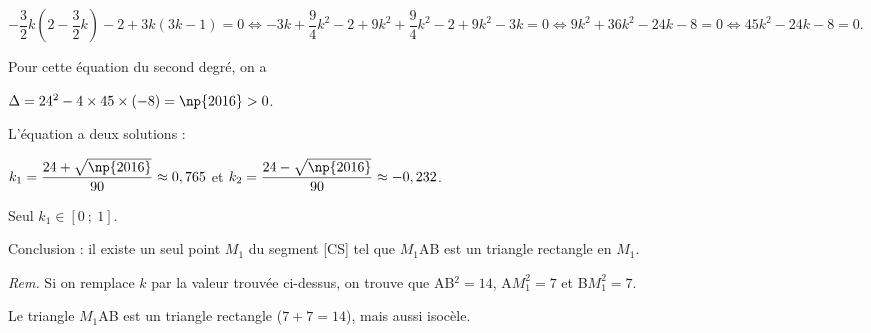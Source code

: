 \begin{enumerate}
$- \dfrac 32 k\left(2 - \dfrac 32 k\right) - 2 + 3k(3k - 1) = 0 \iff - 3k + \dfrac 94 k^2 - 2 + 9k^2 + \dfrac 94 k^2 - 2 + 9k^2 - 3k = 0 \iff 
9k^2 + 36k^2 - 24k- 8 = 0 \iff 45k^2- 24k - 8 = 0$.

Pour cette équation du second degré, on a 

$\Delta = 24^2 - 4 \times 45 \times (- 8) = \np{2016} > 0$.

L'équation a deux solutions :

$k_1 = \dfrac{24+ \sqrt{\np{2016}}}{90} \approx 0,765$ et 
$k_2 = \dfrac{24 - \sqrt{\np{2016}}}{90} \approx -0,232$.

Seul $k_1 \in [0~;~1]$.

Conclusion : il existe un seul point $M_1$ du segment [CS] tel que $M_1$AB est un triangle rectangle en $M_1$.

\emph{Rem.} Si on remplace $k$ par la valeur trouvée ci-dessus, on trouve que AB$^2 = 14$, \: A$M_1^2 = 7$ et B$M_1^2 = 7$.

Le triangle $M_1$AB est un triangle rectangle ($7 + 7 = 14$), mais aussi isocèle.
\end{enumerate}

\medskip
